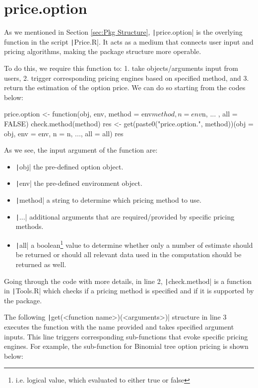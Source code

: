 \section{price.option}

As we mentioned in Section \ref{sec:Pkg Structure}, \texttt|price.option| is the overlying function in the script \texttt|Price.R|. It acts as a medium that connects user input and pricing algorithms, making the package structure more operable.

To do this, we require this function to: 1. take objects/arguments input from users, 2. trigger corresponding pricing engines based on specified method, and 3. return the estimation of the option price. We can do so starting from the codes below:

\begin{Rminted}
price.option <- function(obj, env, method = env$method, n = env$n, ... , all = FALSE) {
    check.method(method)
    res <- get(paste0("price.option.", method))(obj = obj, env = env, n = n, ..., all = all)
    res
}
\end{Rminted}

As we see, the input argument of the function are:

\begin{itemize}
    \item \texttt|obj| the pre-defined option object.
    \item \texttt|env| the pre-defined environment object.
    \item \texttt|method| a string to determine which pricing method to use.
    \item \texttt|...| additional arguments that are required/provided by specific pricing methods.
    \item \texttt|all| a boolean\footnote{i.e. logical value, which evaluated to either true or false} value to determine whether only a number of estimate should be returned or should all relevant data used in the computation should be returned as well.
\end{itemize}

Going through the code with more details, in line 2, \texttt|check.method| is a function in \texttt|Tools.R| which checks if a pricing method is specified and if it is supported by the package.

The following \texttt|get(<function name>)(<arguments>)| structure in line 3 executes the function with the name provided and takes specified argument inputs. This line triggers corresponding sub-functions that evoke specific pricing engines. For example, the sub-function for Binomial tree option pricing is shown below:

